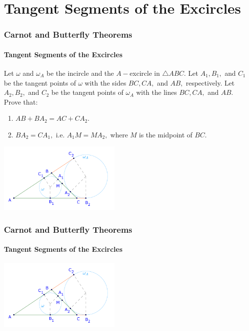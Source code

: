 \documentclass[8pt,xcolor=table,dvipsnames]{beamer}
\begin{document}
\section{Tangent Segments of the Excircles}

\begin{frame}[t]
    \frametitle{Carnot and Butterfly Theorems}
    \framesubtitle{Tangent Segments of the Excircles}
    \begin{theorem}
        Let $\omega$ and $\omega_A$ be the incircle and the $A-$excircle in $\triangle ABC.$
        Let $A_1, B_1,$ and $C_1$ be the tangent points of $\omega$ with the sides $BC, CA,$ and $AB,$ respectively.
        Let $A_2, B_2,$ and $C_2$ be the tangent points of $\omega_A$ with the lines $BC, CA,$ and $AB.$ Prove that:
        \begin{enumerate}
            \item $AB + BA_2 = AC + CA_2.$
            \item $BA_2 = CA_1,$ i.e. $A_1M = MA_2,$ where $M$ is the midpoint of $BC.$
        \end{enumerate}
    \end{theorem}
    \begin{center}
        \includegraphics[width=6cm]{./svg/pdf/24-25-s7-g3-t2.pdf}
    \end{center}
\end{frame}

\begin{frame}[t]
    \frametitle{Carnot and Butterfly Theorems}
    \framesubtitle{Tangent Segments of the Excircles}
    \begin{center}
        \includegraphics[width=6cm]{./svg/pdf/24-25-s7-g3-t2.pdf}
    \end{center}
\end{frame}
\end{document}
